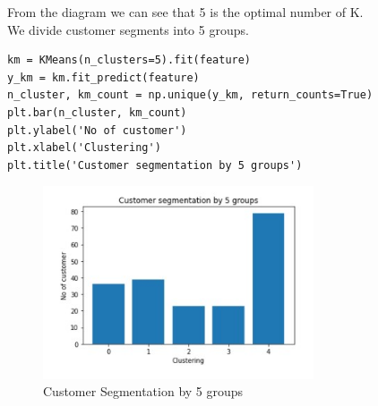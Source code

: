 \documentclass{article}
\begin{document}
From the diagram we can see that 5 is the optimal number of K.\\

We divide customer segments into 5 groups.
\begin{lstlisting}
km = KMeans(n_clusters=5).fit(feature)
y_km = km.fit_predict(feature)
n_cluster, km_count = np.unique(y_km, return_counts=True)
plt.bar(n_cluster, km_count)
plt.ylabel('No of customer')
plt.xlabel('Clustering')
plt.title('Customer segmentation by 5 groups')
\end{lstlisting}

\begin{figure}[htp]
    \centering
    \includegraphics[width=8cm]{Clusters1.jpg}
    \caption{Customer Segmentation by 5 groups}
    \label{fig:Customer Segmentation by 5 groups}
\end{figure}

\vspace{5cm}
\end{document}
